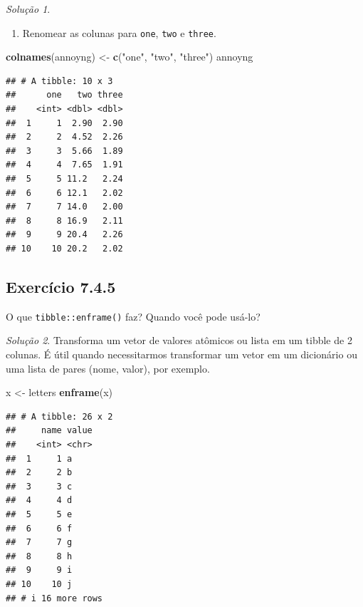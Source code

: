 \documentclass[
]{latex/krantz}
\newenvironment{Shaded}{\begin{snugshade}}{\end{snugshade}}
\newcommand{\FunctionTok}[1]{\textcolor[rgb]{0.13,0.29,0.53}{\textbf{#1}}}
\newcommand{\NormalTok}[1]{#1}
\newcommand{\OtherTok}[1]{\textcolor[rgb]{0.56,0.35,0.01}{#1}}
\newcommand{\StringTok}[1]{\textcolor[rgb]{0.31,0.60,0.02}{#1}}
\providecommand{\tightlist}{%
  \setlength{\itemsep}{0pt}\setlength{\parskip}{0pt}}
\theoremstyle{definition}
\theoremstyle{definition}
\theoremstyle{definition}
\theoremstyle{definition}
\theoremstyle{remark}
\newtheorem*{solution}{Solução}
\begin{document}
\begin{solution}
\begin{enumerate}
\def\labelenumi{\alph{enumi}.}
\setcounter{enumi}{3}
\tightlist
\item
  Renomear as colunas para \texttt{one}, \texttt{two} e \texttt{three}.
\end{enumerate}

\begin{Shaded}
\begin{Highlighting}[]
\FunctionTok{colnames}\NormalTok{(annoyng) }\OtherTok{\textless{}{-}} \FunctionTok{c}\NormalTok{(}\StringTok{"one"}\NormalTok{, }\StringTok{"two"}\NormalTok{, }\StringTok{"three"}\NormalTok{)}
\NormalTok{annoyng}
\end{Highlighting}
\end{Shaded}

\begin{verbatim}
## # A tibble: 10 x 3
##      one   two three
##    <int> <dbl> <dbl>
##  1     1  2.90  2.90
##  2     2  4.52  2.26
##  3     3  5.66  1.89
##  4     4  7.65  1.91
##  5     5 11.2   2.24
##  6     6 12.1   2.02
##  7     7 14.0   2.00
##  8     8 16.9   2.11
##  9     9 20.4   2.26
## 10    10 20.2   2.02
\end{verbatim}

\end{solution}

\hypertarget{exr7-4-5}{%
\subsection*{Exercício 7.4.5}\label{exr7-4-5}}

O que \texttt{tibble::enframe()} faz? Quando você pode usá-lo?

\begin{solution}

Transforma um vetor de valores atômicos ou lista em um tibble de 2 colunas. É útil quando necessitarmos transformar um vetor em um dicionário ou uma lista de pares (nome, valor), por exemplo.

\begin{Shaded}
\begin{Highlighting}[]
\NormalTok{x }\OtherTok{\textless{}{-}}\NormalTok{ letters}
\FunctionTok{enframe}\NormalTok{(x)}
\end{Highlighting}
\end{Shaded}

\begin{verbatim}
## # A tibble: 26 x 2
##     name value
##    <int> <chr>
##  1     1 a    
##  2     2 b    
##  3     3 c    
##  4     4 d    
##  5     5 e    
##  6     6 f    
##  7     7 g    
##  8     8 h    
##  9     9 i    
## 10    10 j    
## # i 16 more rows
\end{verbatim}

\end{solution}
\end{document}

